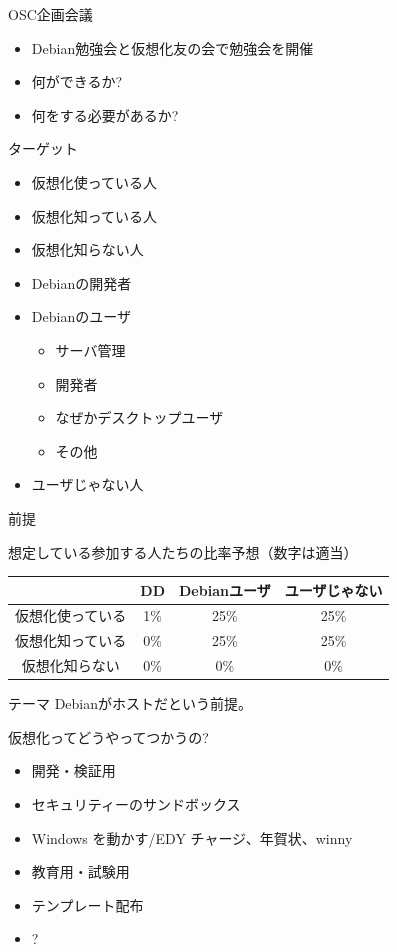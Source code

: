 \documentclass[cjk,dvipdfmx]{beamer}
\begin{document}
\begin{frame}{OSC企画会議}
\begin{itemize}
 \item Debian勉強会と仮想化友の会で勉強会を開催
 \item 何ができるか?
 \item 何をする必要があるか?
\end{itemize}
\end{frame}

\begin{frame}{ターゲット}
\begin{minipage}[t]{0.4\hsize}
\begin{itemize}
 \item 仮想化使っている人
 \item 仮想化知っている人
 \item 仮想化知らない人
\end{itemize}
\end{minipage}
\begin{minipage}[t]{0.5\hsize}
\begin{itemize}
 \item Debianの開発者
 \item Debianのユーザ
       \begin{itemize}
	\item サーバ管理
	\item 開発者
	\item なぜかデスクトップユーザ
	\item その他
       \end{itemize}
 \item ユーザじゃない人
\end{itemize}
\end{minipage}
\end{frame}

\begin{frame}{前提}

想定している参加する人たちの比率予想（数字は適当）
\begin{tabular}{|c|c|c|c|}
\hline
 & DD & Debianユーザ& ユーザじゃない \\
\hline
仮想化使っている & 1\% & 25\% & 25\% \\
\hline
仮想化知っている & 0\% & 25\% & 25\% \\
\hline
仮想化知らない & 0\% & 0\% & 0\% \\
\hline
\end{tabular}
\end{frame}

\begin{frame}{テーマ}
Debianがホストだという前提。

仮想化ってどうやってつかうの?
\begin{itemize}[<+->]
 \item 開発・検証用
 \item セキュリティーのサンドボックス
 \item Windows を動かす/EDY チャージ、年賀状、winny
 \item 教育用・試験用
 \item テンプレート配布
 \item ?
\end{itemize}
\end{frame}
\end{document}
